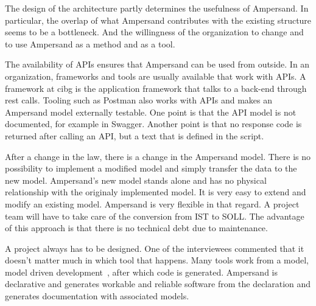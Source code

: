 The design of the architecture partly determines the usefulness of Ampersand.
In particular, the overlap of what Ampersand contributes with the existing structure seems to be a bottleneck.
And the willingness of the organization to change and to use Ampersand as a method and as a tool.

The availability of APIs ensures that Ampersand can be used from outside.
In an organization, frameworks and tools are usually available that work with APIs.
A framework at \acrshort{cibg} is the application framework that talks to a back-end through rest calls.
Tooling such as Postman also works with APIs and makes an Ampersand model externally testable.
One point is that the API model is not documented, for example in Swagger.
Another point is that no response code is returned after calling an API, but a text that is defined in the script.

After a change in the law, there is a change in the Ampersand model.
There is no possibility to implement a modified model and simply transfer the data to the new model.
Ampersand's new model stands alone and has no physical relationship with the originaly implemented model.
It is very easy to extend and modify an existing model.
Ampersand is very flexible in that regard.
A project team will have to take care of the conversion from IST to SOLL.
The advantage of this approach is that there is no technical debt due to maintenance.

A project always has to be designed.
One of the interviewees commented that it doesn't matter much in which tool that happens.
Many tools work from a model, model driven development~\citep{kulkarni_abstraction_2008}, after which code is generated.
Ampersand is declarative and generates workable and reliable software from the declaration and generates documentation with associated models.
